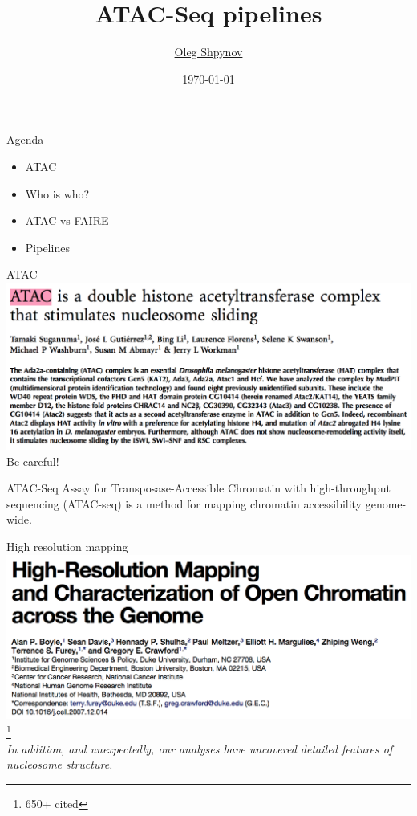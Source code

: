 \documentclass{beamer}
\title{ATAC-Seq pipelines}
\author{\href{mailto:os@jetbrains.com}{Oleg Shpynov}}
\institute{JetBrains Biolabs}
\date{\today}
\begin{document}
\begin{frame}
  \titlepage
\end{frame}

\begin{frame}{Agenda}
\begin{itemize}
	\item ATAC
	\item Who is who?
	\item ATAC vs FAIRE
	\item Pipelines
\end{itemize}
\end{frame}

\begin{frame}{ATAC}
\includegraphics[width=\linewidth]{wrong_atac.png}\\
Be careful!
\end{frame}

\begin{frame}
\begin{block}{ATAC-Seq}
Assay for Transposase-Accessible Chromatin with high-throughput sequencing (ATAC-seq) is a method for mapping chromatin accessibility genome-wide. 
\end{block}
\end{frame}

\begin{frame}{High resolution mapping}
\includegraphics[width=\linewidth]{high_res_mapping.png}\footnote{650+ cited}\\
\textit{In addition, and unexpectedly, our analyses have uncovered detailed features of nucleosome structure.}
\end{frame}
\end{document}
